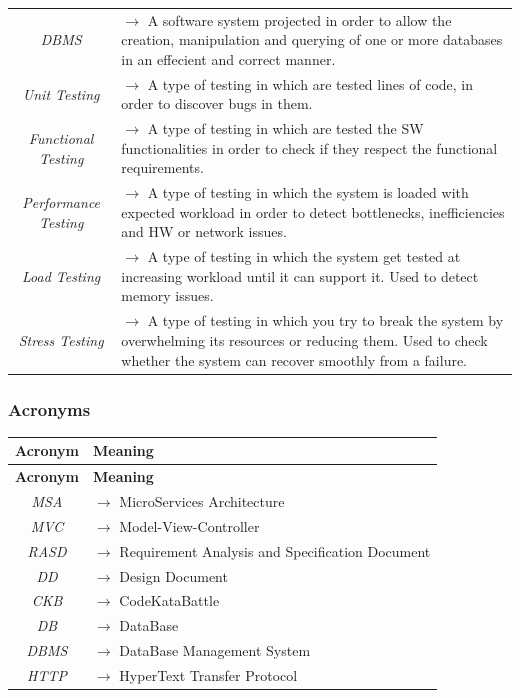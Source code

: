 \documentclass{article}
\begin{document}
{\begin{xltabular}{\textwidth}{ >{\raggedright\arraybackslash}c >{\raggedright\arraybackslash}X }
    \textit{DBMS} & $\rightarrow$ A software system projected in order to allow the creation,
    manipulation and querying of one or more databases in an effecient and correct manner. \\
    \textit{Unit Testing} & $\rightarrow$ A type of testing in which are tested lines of code,
    in order to discover bugs in them. \\
    \textit{Functional Testing} & $\rightarrow$ A type of testing in which are tested the
    SW functionalities in order to check if they respect the functional requirements. \\
    \textit{Performance Testing} & $\rightarrow$ A type of testing in which the system is loaded
    with expected workload in order to detect bottlenecks, inefficiencies and HW or network issues. \\
    \textit{Load Testing} & $\rightarrow$ A type of testing in which the system get tested at
    increasing workload until it can support it. Used to detect memory issues. \\
    \textit{Stress Testing} & $\rightarrow$ A type of testing in which you try to break the
    system by overwhelming its resources or reducing them. Used to check whether the system
    can recover smoothly from a failure.
\end{xltabular}

\subsubsection{Acronyms}
\begin{xltabular}{\textwidth}{ >{\raggedright\arraybackslash}c >{\raggedright\arraybackslash}X }
    \hline
    \textbf{Acronym} & \textbf{Meaning} \\
    \hline

    \endfirsthead

    \hline
    \textbf{Acronym} & \textbf{Meaning} \\
    \hline

    \endhead
    \endfoot
    \endlastfoot

    \textit{MSA} & $\rightarrow$ MicroServices Architecture\\
    \textit{MVC} & $\rightarrow$ Model-View-Controller\\
    \textit{RASD} & $\rightarrow$ Requirement Analysis and Specification Document\\
    \textit{DD} & $\rightarrow$ Design Document\\
    \textit{CKB} & $\rightarrow$ CodeKataBattle\\
    \textit{DB} & $\rightarrow$ DataBase \\
    \textit{DBMS} & $\rightarrow$ DataBase Management System \\
    \textit{HTTP} & $\rightarrow$ HyperText Transfer Protocol


\end{xltabular}}
\end{document}
